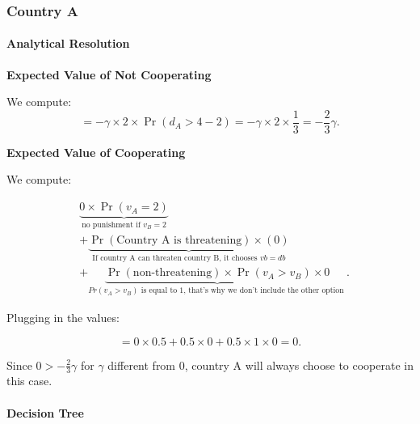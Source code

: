 \documentclass{article}
\begin{document}
\subsubsection{Country A}


\paragraph{Analytical Resolution}

\textbf{Expected Value of Not Cooperating}

We compute:
\[
= -\gamma \times 2 \times \Pr(d_A > 4 - 2)
= -\gamma \times 2 \times \frac{1}{3}
= -\frac{2}{3}\gamma.
\]

\textbf{Expected Value of Cooperating}

We compute:

\begin{align*}
&\underbrace{
    0 \times \Pr(v_A = 2)
}_{\text{no punishment if $v_B = 2$}}
\\[3ex]
&+
\underbrace{
   \Pr(\text{Country A is threatening})
    \times (0)
}_{\text{If country A can threaten country B, it chooses $vb=db$}}
\\[3ex]
&+
\underbrace{
    \Pr(\text{non-threatening})
    \times \Pr(v_A > v_B)
    \times 0
}_{\text{$Pr(v_A > v_B)$ is equal to 1, that's why we don't include the other option }}.
\end{align*}

Plugging in the values:

\[
= 0 \times 0.5
+ 0.5 \times 0 
+ 0.5 \times 1 \times 0
= 0.
\]

Since $0> -\frac{2}{3}\gamma$ for $\gamma$ different from 0, country A will always choose to cooperate in this case.

\paragraph{Decision Tree}
\end{document}

